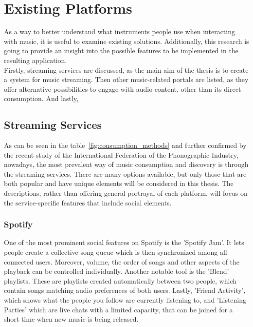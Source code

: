 \chapter{Existing Platforms}\label{chap:platforms}
As a way to better understand what instruments people use when interacting with music,
it is useful to examine existing solutions. Additionally, this research is going to provide an insight
into the possible features to be implemented in the resulting application.\\
Firstly, streaming services are discussed, as the main aim of the thesis is to create a system for music streaming.
Then other music-related portals are listed, as they offer alternative possibilities to engage with audio content,
other than its direct consumption.
And lastly,



\section{Streaming Services}
As can be seen in the table~\ref{fig:consumption_methods} and further confirmed by
the recent study of the International Federation of the Phonographic Industry\cite{music_stats_2024},
nowadays, the most prevalent way of music consumption
and discovery is through the streaming services. There are many options available,
but only those that are both popular and have unique elements will be considered in this thesis.
The descriptions, rather than offering general portrayal of each platform,
will focus on the service-specific features that include social elements.

\subsection{Spotify}
One of the most prominent social features on Spotify is the 'Spotify Jam'\cite{spotify_jam}.
It lets people create a collective song queue which is then synchronized among all connected users.
Moreover, volume, the order of songs and other aspects of the playback can be controlled individually.
Another notable tool is the 'Blend' playlists\cite{spotify_recs}. These are playlists created automatically
between two people, which contain songs matching audio preferences of both users.
Lastly, 'Friend Activity'\cite{spotify_friend_activ}, which shows what the people you follow are currently listening to,
and 'Listening Parties' which are live chats with a limited capacity,
that can be joined for a short time when new music is being released\cite{spotify_party_1,spotify_party_2}.

